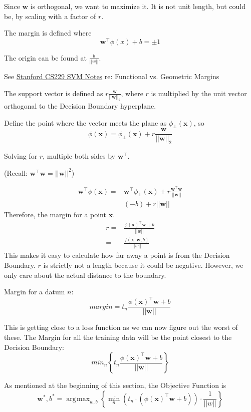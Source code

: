 \documentclass[11pt, oneside]{article}   	%
\DeclareMathOperator*{\argmax}{\arg\!\max}
\begin{document}
Since $\mathbf{w}$ is orthogonal, we want to maximize it. It is not unit length, but could be, by scaling with a factor of $r$.

The margin is defined where
\[
\mathbf{w}^\intercal\phi(x)+b = \pm 1
\]

The origin can be found at $\frac{b}{||w||}$.

See \href{http://cs229.stanford.edu/notes/cs229-notes3.pdf}{Stanford CS229 SVM Notes} re: Functional vs. Geometric Margins

The support vector is defined as $r\frac{\mathbf{w}}{||\mathbf{w}||_2}$, where $r$ is multiplied by the unit vector orthogonal to the Decision Boundary hyperplane. 

Define the point where the vector meets the plane as $\phi_\perp (\mathbf{x})$, so
\begin{equation}
\phi(\mathbf{x}) = \phi_\perp(\mathbf{x}) + r\frac{\mathbf{w}}{||\mathbf{w}||_2}
\end{equation}

Solving for $r$, multiple both sides by $\mathbf{w}^\intercal$.

(Recall: $\mathbf{w}^\intercal\mathbf{w} = ||\mathbf{w}||^2$)

\begin{align}
\mathbf{w}^\intercal\phi(\mathbf{x}) = &\mathbf{w}^\intercal  \phi_\perp(\mathbf{x})  +	 r\frac{\mathbf{w}^\intercal\mathbf{w}}{||\mathbf{w}||} \\
			 = & (-b) + r||\mathbf{w}||
\end{align}
Therefore, the margin for a point $\mathbf{x}$.
\begin{align}
r = &\frac{\phi(\mathbf{x})^\intercal\mathbf{w}+b}{||w||} \\
  = & \frac{f(\mathbf{x},\mathbf{w},b)}{||w||}
\end{align}
This makes it easy to calculate how far away a point is from the Decision Boundary. $r$ is strictly not a length because it could be negative. However, we only care about the actual distance to the boundary.

Margin for a datum $n$:
\[
margin = t_n\frac{\phi(\mathbf{x})^\intercal\mathbf{w}+b}{||\mathbf{w}||}
\]

This is getting close to a loss function as we can now figure out the worst of these. The Margin for all the training data will be the point closest to the Decision Boundary:
\[
min_n\left\{ t_n\frac{\phi(\mathbf{x})^\intercal\mathbf{w}+b}{||\mathbf{w}||} \right\}
\]

As mentioned at the beginning of this section, the Objective Function is 
\[
\mathbf{w}^*,b^*=
\argmax_{w,b} \left\{\min_n(t_n\cdot(\phi(\mathbf{x})^\intercal\mathbf{w}+b))\cdot\frac{1}{||w||} \right\}
\]
\end{document}
